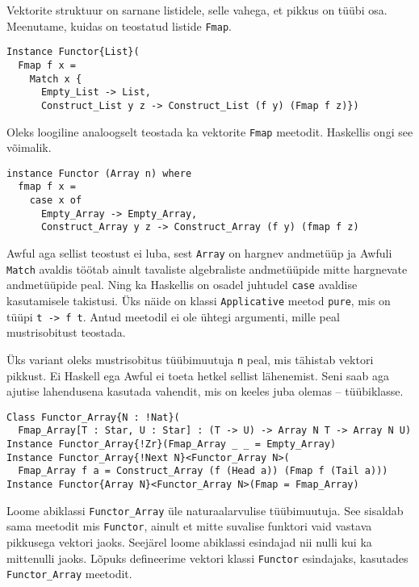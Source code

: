 \documentclass[12pt]{article}
\begin{document}
      Vektorite struktuur on sarnane listidele, selle vahega, et pikkus on tüübi osa. Meenutame, kuidas on teostatud listide \verb!Fmap!.

      \begin{verbatim}Instance Functor{List}(
  Fmap f x =
    Match x {
      Empty_List -> List,
      Construct_List y z -> Construct_List (f y) (Fmap f z)})\end{verbatim}

      Oleks loogiline analoogselt teostada ka vektorite \verb!Fmap! meetodit. Haskellis ongi see võimalik.

      \begin{verbatim}instance Functor (Array n) where
  fmap f x =
    case x of
      Empty_Array -> Empty_Array,
      Construct_Array y z -> Construct_Array (f y) (fmap f z)\end{verbatim}

      Awful aga sellist teostust ei luba, sest \verb!Array! on hargnev andmetüüp ja Awfuli \verb!Match! avaldis töötab ainult tavaliste algebraliste andmetüüpide mitte hargnevate andmetüüpide peal. Ning ka Haskellis on osadel juhtudel \verb!case! avaldise kasutamisele takistusi. Üks näide on klassi \verb!Applicative! meetod \verb!pure!, mis on tüüpi \verb!t -> f t!. Antud meetodil ei ole ühtegi argumenti, mille peal mustrisobitust teostada.

      Üks variant oleks mustrisobitus tüübimuutuja \verb!n! peal, mis tähistab vektori pikkust. Ei Haskell ega Awful ei toeta hetkel sellist lähenemist. Seni saab aga ajutise lahendusena kasutada vahendit, mis on keeles juba olemas -- tüübiklasse.

      \begin{verbatim}Class Functor_Array{N : !Nat}(
  Fmap_Array[T : Star, U : Star] : (T -> U) -> Array N T -> Array N U)
Instance Functor_Array{!Zr}(Fmap_Array _ _ = Empty_Array)
Instance Functor_Array{!Next N}<Functor_Array N>(
  Fmap_Array f a = Construct_Array (f (Head a)) (Fmap f (Tail a)))
Instance Functor{Array N}<Functor_Array N>(Fmap = Fmap_Array)\end{verbatim}

      Loome abiklassi \verb!Functor_Array! üle naturaalarvulise tüübimuutuja. See sisaldab sama meetodit mis \verb!Functor!, ainult et mitte suvalise funktori vaid vastava pikkusega vektori jaoks. Seejärel loome abiklassi esindajad nii nulli kui ka mittenulli jaoks. Lõpuks defineerime vektori klassi \verb!Functor! esindajaks, kasutades \verb!Functor_Array! meetodit.
\end{document}
